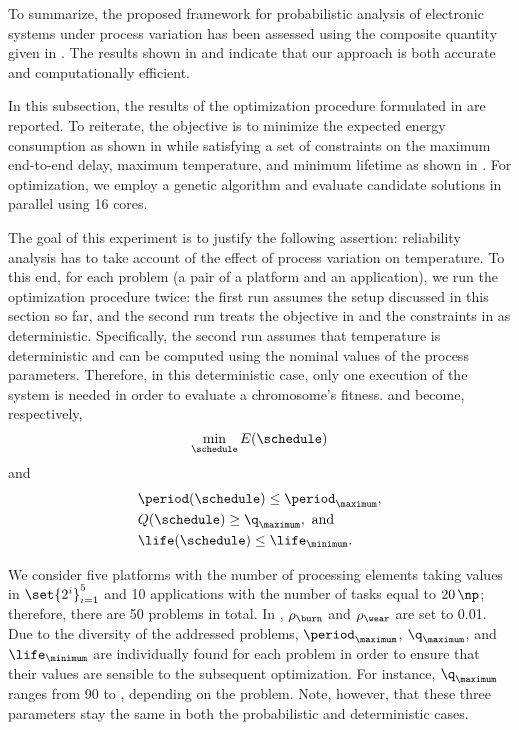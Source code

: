 To summarize, the proposed framework for probabilistic analysis of electronic
systems under process variation has been assessed using the composite quantity
given in . The results shown in
 and  indicate
that our approach is both accurate and computationally efficient.


In this subsection, the results of the optimization procedure formulated in
 are reported. To reiterate, the objective is to
minimize the expected energy consumption as shown in
 while satisfying a set of constraints on the
maximum end-to-end delay, maximum temperature, and minimum lifetime as shown in
. For optimization, we employ a genetic
algorithm and evaluate candidate solutions in parallel using 16 cores.

The goal of this experiment is to justify the following assertion: reliability
analysis has to take account of the effect of process variation on temperature.
To this end, for each problem (a pair of a platform and an application), we run
the optimization procedure twice: the first run assumes the setup discussed in
this section so far, and the second run treats the objective in
 and the constraints in
 as deterministic. Specifically, the second
run assumes that temperature is deterministic and can be computed using the
nominal values of the process parameters. Therefore, in this deterministic case,
only one execution of the system is needed in order to evaluate a chromosome's
fitness.  and
 become, respectively,
\[
    \min_{\schedule} E(\schedule)
\]
and
\begin{align*}
  & \period(\schedule) \leq \period_\maximum, \\
  & Q(\schedule) \geq \q_\maximum, \text{ and} \\
  & \life(\schedule) \leq \life_\minimum.
\end{align*}

We consider five platforms with the number of processing elements \np taking
values in $\set{2^i}_{i = 1}^5$ and 10 applications with the number of tasks \nt
equal to $20 \, \np$; therefore, there are 50 problems in total. In
, $\rho_\burn$ and $\rho_\wear$ are set to
0.01. Due to the diversity of the addressed problems, $\period_\maximum$,
$\q_\maximum$, and $\life_\minimum$ are individually found for each problem in
order to ensure that their values are sensible to the subsequent optimization.
For instance, $\q_\maximum$ ranges from 90 to , depending on the
problem. Note, however, that these three parameters stay the same in both the
probabilistic and deterministic cases.

